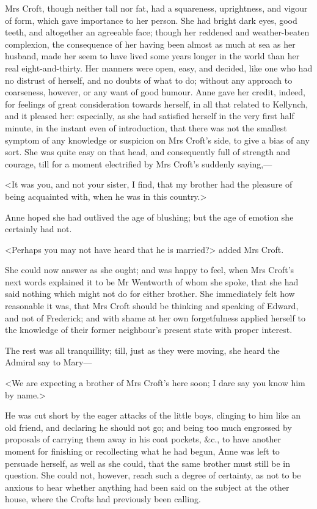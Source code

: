 Mrs Croft, though neither tall nor fat, had a squareness, uprightness, and vigour of form, which gave importance to her person. She had bright dark eyes, good teeth, and altogether an agreeable face; though her reddened and weather-beaten complexion, the consequence of her having been almost as much at sea as her husband, made her seem to have lived some years longer in the world than her real eight-and-thirty. Her manners were open, easy, and decided, like one who had no distrust of herself, and no doubts of what to do; without any approach to coarseness, however, or any want of good humour. Anne gave her credit, indeed, for feelings of great consideration towards herself, in all that related to Kellynch, and it pleased her: especially, as she had satisfied herself in the very first half minute, in the instant even of introduction, that there was not the smallest symptom of any knowledge or suspicion on Mrs Croft's side, to give a bias of any sort. She was quite easy on that head, and consequently full of strength and courage, till for a moment electrified by Mrs Croft's suddenly saying,—

<It was you, and not your sister, I find, that my brother had the pleasure of being acquainted with, when he was in this country.>

Anne hoped she had outlived the age of blushing; but the age of emotion she certainly had not.

<Perhaps you may not have heard that he is married?> added Mrs Croft.

She could now answer as she ought; and was happy to feel, when Mrs Croft's next words explained it to be Mr Wentworth of whom she spoke, that she had said nothing which might not do for either brother. She immediately felt how reasonable it was, that Mrs Croft should be thinking and speaking of Edward, and not of Frederick; and with shame at her own forgetfulness applied herself to the knowledge of their former neighbour's present state with proper interest.

The rest was all tranquillity; till, just as they were moving, she heard the Admiral say to Mary—

<We are expecting a brother of Mrs Croft's here soon; I dare say you know him by name.>

He was cut short by the eager attacks of the little boys, clinging to him like an old friend, and declaring he should not go; and being too much engrossed by proposals of carrying them away in his coat pockets, \&c., to have another moment for finishing or recollecting what he had begun, Anne was left to persuade herself, as well as she could, that the same brother must still be in question. She could not, however, reach such a degree of certainty, as not to be anxious to hear whether anything had been said on the subject at the other house, where the Crofts had previously been calling.


